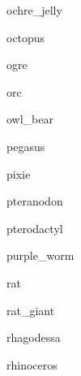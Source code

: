 \documentclass[letterpaper,serif]{module}
\begin{document}
\begin{newmonster}{ochre_jelly}\end{newmonster}

\begin{newmonster}{octopus}\end{newmonster}

\begin{newmonster}{ogre}\end{newmonster}

\begin{newmonster}{orc}\end{newmonster}

\begin{newmonster}{owl_bear}\end{newmonster}

\begin{newmonster}{pegasus}\end{newmonster}

\begin{newmonster}{pixie}\end{newmonster}

\begin{newmonster}{pteranodon}\end{newmonster}

\begin{newmonster}{pterodactyl}\end{newmonster}

\begin{newmonster}{purple_worm}\end{newmonster}

\begin{newmonster}{rat}\end{newmonster}

\begin{newmonster}{rat_giant}\end{newmonster}

\begin{newmonster}{rhagodessa}\end{newmonster}

\begin{newmonster}{rhinoceros}\end{newmonster}
\end{document}
